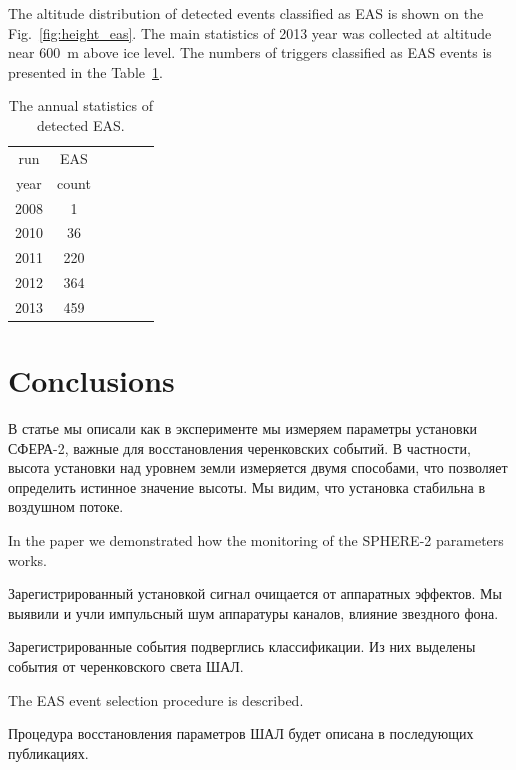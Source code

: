 \documentclass[final,5p,times,twocolumn]{elsarticle}
\begin{document}
The altitude distribution of detected events classified as EAS is shown on the Fig.~\ref{fig:height_eas}. The main statistics of 2013 year was collected at altitude near 600~m above ice level. The numbers of triggers classified as EAS events is presented in the Table~\ref{tab:EASstatistics}.


\begin{table}[h]
    \centering
    \caption{The annual statistics of detected EAS.}
    \label{tab:EASstatistics}
    \vspace{1pc}
    \begin{tabular}{|c||c|r|c|r|r|}
    \hline
    run  &  EAS\\ 
    year &  count\\ 
    \hline \hline
    2008 &   1\\  
    2010 &  36\\
    2011 & 220\\
    2012 & 364\\
    2013 & 459\\
    \hline
    \end{tabular}
\end{table}


\section{Conclusions \label{sect:conclusions}}

{
\Russian

В статье мы описали как в эксперименте мы измеряем параметры установки  СФЕРА-2, важные для восстановления черенковских событий.  В частности, высота установки над уровнем земли измеряется двумя способами, что позволяет определить истинное значение высоты. Мы видим, что установка стабильна в воздушном потоке.} 
In the paper we demonstrated how the monitoring of the SPHERE-2 parameters works. 

{
\Russian
Зарегистрированный установкой сигнал очищается от аппаратных эффектов. Мы выявили и учли импульсный шум аппаратуры каналов, влияние звездного фона. 

Зарегистрированные события подверглись классификации. Из них выделены события от черенковского света ШАЛ. }The EAS event selection procedure is described.

{
\Russian
Процедура восстановления параметров ШАЛ будет описана в последующих публикациях.
}




\appendix
\end{document}
